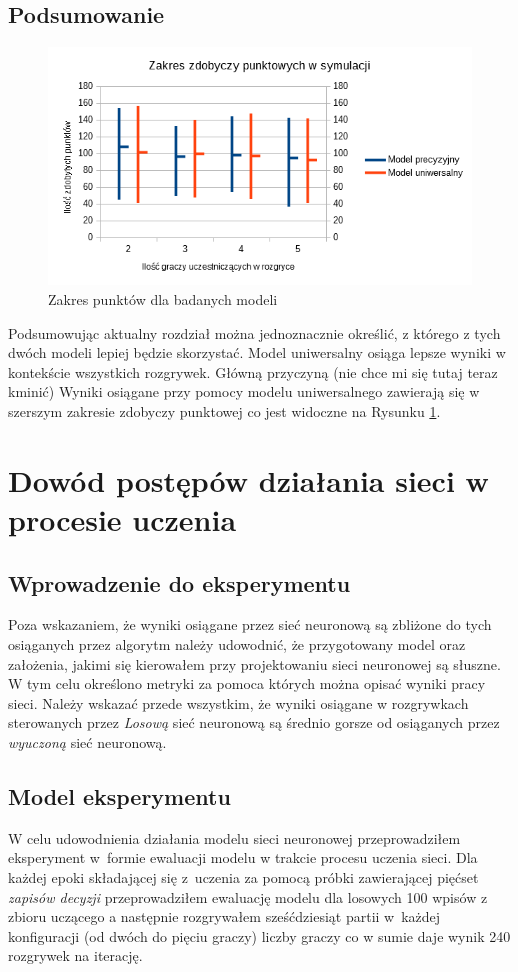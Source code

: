 \documentclass[12pt, oneside]{report}
\begin{document}
\section{Podsumowanie}
\begin{figure}[h]
	\includegraphics[width=\linewidth]{ZakresPunktow.png}
	\caption{Zakres punktów dla badanych modeli}
	\label{figure:points_range}
\end{figure}
Podsumowując aktualny rozdział można jednoznacznie określić, z którego z tych dwóch modeli lepiej będzie skorzystać. Model uniwersalny osiąga lepsze wyniki w kontekście wszystkich rozgrywek. Główną przyczyną (nie chce mi się tutaj teraz kminić) Wyniki osiągane przy pomocy modelu uniwersalnego zawierają się w szerszym zakresie zdobyczy punktowej co jest widoczne na Rysunku \ref{figure:points_range}.

\chapter{Dowód postępów działania sieci w procesie uczenia}
\section{Wprowadzenie do eksperymentu}
Poza wskazaniem, że wyniki osiągane przez sieć neuronową są zbliżone do tych osiąganych przez algorytm należy udowodnić, że przygotowany model oraz założenia, jakimi się kierowałem przy projektowaniu sieci neuronowej są słuszne. W tym celu określono metryki za pomoca których można opisać wyniki pracy sieci. Należy wskazać przede wszystkim, że wyniki osiągane w rozgrywkach sterowanych przez \textit{Losową} sieć neuronową są średnio gorsze od osiąganych przez \textit{wyuczoną} sieć neuronową.
\section{Model eksperymentu}
W celu udowodnienia działania modelu sieci neuronowej przeprowadziłem eksperyment w~formie ewaluacji modelu w trakcie procesu uczenia sieci. Dla każdej epoki składającej się z~uczenia za pomocą próbki zawierającej pięćset \textit{zapisów decyzji} przeprowadziłem ewaluację modelu dla losowych 100 wpisów z zbioru uczącego a następnie rozgrywałem sześćdziesiąt partii w~każdej konfiguracji (od dwóch do pięciu graczy) liczby graczy co w sumie daje wynik 240 rozgrywek na iterację.
\end{document}
